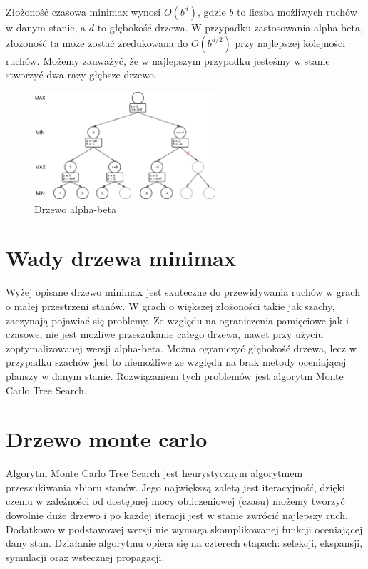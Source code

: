 Złożoność czasowa minimax wynosi $O(b^d)$, gdzie $b$ to liczba możliwych ruchów w danym stanie, a $d$ to głębokość drzewa. W przypadku zastosowania alpha-beta, złożoność ta może zostać zredukowana do $O(b^{d/2})$ przy najlepszej kolejności ruchów. Możemy zauważyć, że w najlepszym przypadku jesteśmy w stanie stworzyć dwa razy głębsze drzewo.

\begin{figure}[!ht]
\centering
\includegraphics[width=0.6\textwidth]{images/alpha-beta.png}
\caption{Drzewo alpha-beta}
\end{figure}

\section*{Wady drzewa minimax}
Wyżej opisane drzewo minimax jest skuteczne do przewidywania ruchów w grach o małej przestrzeni stanów. W grach o większej złożoności takie jak szachy, zaczynają pojawiać się problemy. Ze względu na ograniczenia pamięciowe jak i czasowe, nie jest możliwe przeszukanie całego drzewa, nawet przy użyciu zoptymalizowanej wersji alpha-beta. Można ograniczyć głębokość drzewa, lecz w przypadku szachów jest to niemożliwe ze względu na brak metody oceniającej planszy w danym stanie. Rozwiązaniem tych problemów jest algorytm Monte Carlo Tree Search.

\section*{Drzewo monte carlo}
Algorytm Monte Carlo Tree Search jest heurystycznym algorytmem przeszukiwania zbioru stanów. Jego największą zaletą jest iteracyjność, dzięki czemu w zależności od dostępnej mocy obliczeniowej (czasu) możemy tworzyć dowolnie duże drzewo i po każdej iteracji jest w stanie zwrócić najlepszy ruch. Dodatkowo w podstawowej wersji nie wymaga skomplikowanej funkcji oceniającej dany stan. Działanie algorytmu opiera się na czterech etapach: selekcji, ekspansji, symulacji oraz wstecznej propagacji.

